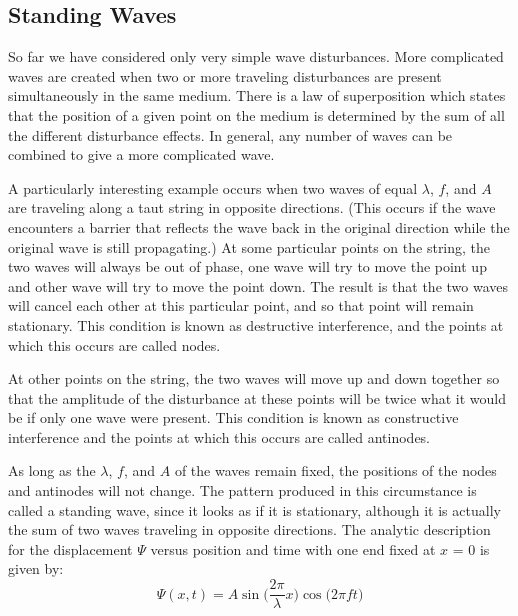 \subsection{Standing Waves}

So far we have considered only very simple wave disturbances. More complicated waves are created when two or more traveling disturbances are present simultaneously in the same medium. There is a law of superposition which states that the position of a given point on the medium is determined by the sum of all the different disturbance effects. In general, any number of waves can be combined to give a more complicated wave.\myskip

A particularly interesting example occurs when two waves of equal $\lambda$, $f$, and $A$ are traveling along a taut string in opposite directions. (This occurs if the wave encounters a barrier that reflects the wave back in the original direction while the original wave is still propagating.) At some particular points on the string, the two waves will always be out of phase, one wave will try to move the point up and other wave will try to move the point down. The result is that the two waves will cancel each other at this particular point, and so that point will remain stationary. This condition is known as destructive interference, and the points at which this occurs are called nodes. \myskip

At other points on the string, the two waves will move up and down together so that the amplitude of the disturbance at these points will be twice what it would be if only one wave were present. This condition is known as constructive interference and the points at which this occurs are called antinodes. \myskip

As long as the $\lambda$, $f$, and $A$ of the waves remain fixed, the positions of the nodes and antinodes will not change. The pattern produced in this circumstance is called a standing wave, since it looks as if it is stationary, although it is actually the sum of two waves traveling in opposite directions. The analytic description for the displacement $\Psi$ versus position and time with one end fixed at $x$ = 0 is given by:
\begin{equation}
\Psi (x,t) =  A\sin\bigg(\frac{2\pi}{\lambda}x\bigg)\cos\bigg(2\pi f t\bigg)
\end{equation}

